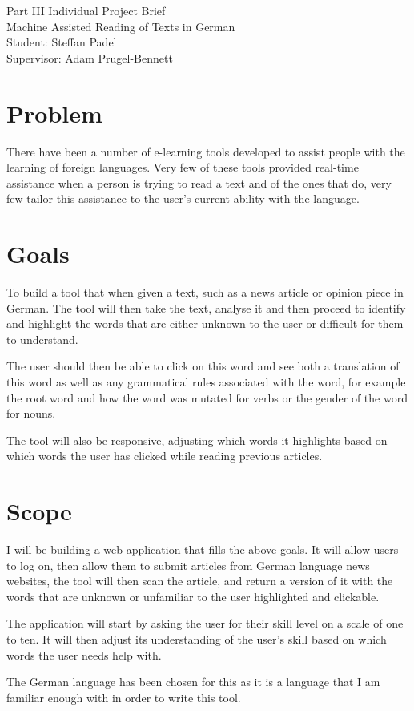 \documentclass{article}
\begin{document}
\begin{center}
    {\large Part III Individual Project Brief}\\
    {\Huge Machine Assisted Reading of Texts in German}\\
    Student: Steffan Padel\\
    Supervisor: Adam Prugel-Bennett\\
\end{center}

\section{Problem}

There have been a number of e-learning tools developed to assist people with the learning of foreign languages. Very few of these tools provided real-time assistance when a person is trying to read a text and of the ones that do, very few tailor this assistance to the user's current ability with the language.

\section{Goals}

To build a tool that when given a text, such as a news article or opinion piece in German. The tool will then take the text, analyse it and then proceed to identify and highlight the words that are either unknown to the user or difficult for them to understand.

The user should then be able to click on this word and see both a translation of this word as well as any grammatical rules associated with the word, for example the root word and how the word was mutated for verbs or the gender of the word for nouns.

The tool will also be responsive, adjusting which words it highlights based on which words the user has clicked while reading previous articles.

\section{Scope}

I will be building a web application that fills the above goals. It will allow users to log on, then allow them to submit articles from German language news websites, the tool will then scan the article, and return a version of it with the words that are unknown or unfamiliar to the user highlighted and clickable.

The application will start by asking the user for their skill level on a scale of one to ten. It will then adjust  its understanding of the user's skill based on which words the user needs help with.

The German language has been chosen for this as it is a language that I am familiar enough with in order to write this tool.
\end{document}
